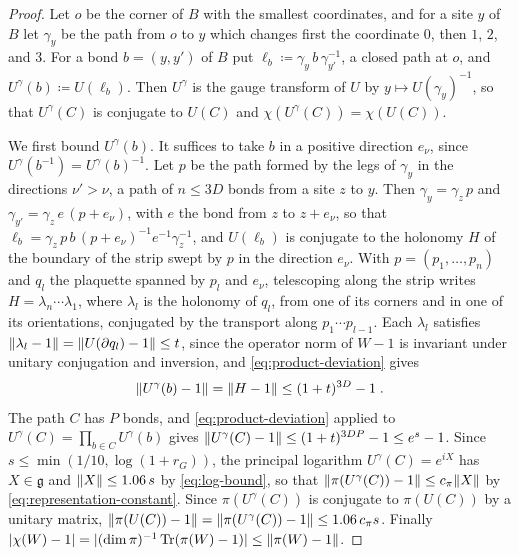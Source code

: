 \documentclass[11pt]{preprint}
\DeclarePairedDelimiter{\abs}{\lvert}{\rvert}
\DeclarePairedDelimiter{\norm}{\lVert}{\rVert}
\numberwithin{equation}{section}
\theoremstyle{definition}
\theoremstyle{remark}
\theoremstyle{plain}
\begin{document}
\begin{proof}
Let $o$ be the corner of $B$ with the smallest coordinates, and for a site $y$ of $B$ let $\gamma_y$ be the path from $o$ to $y$ which changes first the coordinate $0$, then $1$, $2$, and $3$. For a bond $b = (y, y')$ of $B$ put $\ell_b \coloneqq \gamma_y\,b\,\gamma_{y'}^{-1}$, a closed path at $o$, and $U^\gamma(b) \coloneqq U(\ell_b)$. Then $U^\gamma$ is the gauge transform of $U$ by $y \mapsto U(\gamma_y)^{-1}$, so that $U^\gamma(C)$ is conjugate to $U(C)$ and $\chi(U^\gamma(C)) = \chi(U(C))$.

We first bound $U^\gamma(b)$. It suffices to take $b$ in a positive direction $e_\nu$, since $U^\gamma(b^{-1}) = U^\gamma(b)^{-1}$. Let $p$ be the path formed by the legs of $\gamma_y$ in the directions $\nu' > \nu$, a path of $n \leq 3D$ bonds from a site $z$ to $y$. Then $\gamma_y = \gamma_z\,p$ and $\gamma_{y'} = \gamma_z\,e\,(p + e_\nu)$, with $e$ the bond from $z$ to $z + e_\nu$, so that $\ell_b = \gamma_z\,p\,b\,(p + e_\nu)^{-1}e^{-1}\gamma_z^{-1}$, and $U(\ell_b)$ is conjugate to the holonomy $H$ of the boundary of the strip swept by $p$ in the direction $e_\nu$. With $p = (p_1, \dots, p_n)$ and $q_l$ the plaquette spanned by $p_l$ and $e_\nu$, telescoping along the strip writes $H = \lambda_n\cdots\lambda_1$, where $\lambda_l$ is the holonomy of $q_l$, from one of its corners and in one of its orientations, conjugated by the transport along $p_1 \cdots p_{l-1}$. Each $\lambda_l$ satisfies $\norm{\lambda_l - 1} = \norm{U(\partial q_l) - 1} \leq t$, since the operator norm of $W - 1$ is invariant under unitary conjugation and inversion, and \eqref{eq:product-deviation} gives
\begin{equation}\label{eq:axial-bond}
    \norm{U^\gamma(b) - 1} = \norm{H - 1} \leq (1 + t)^{3D} - 1\;.
\end{equation}
The path $C$ has $P$ bonds, and \eqref{eq:product-deviation} applied to $U^\gamma(C) = \prod_{b \in C}U^\gamma(b)$ gives $\norm{U^\gamma(C) - 1} \leq (1 + t)^{3DP} - 1 \leq e^s - 1$. Since $s \leq \min(1/10, \log(1 + r_G))$, the principal logarithm $U^\gamma(C) = e^{iX}$ has $X \in \mathfrak g$ and $\norm{X} \leq 1.06\,s$ by \eqref{eq:log-bound}, so that $\norm{\pi(U^\gamma(C)) - 1} \leq c_\pi\norm{X}$ by \eqref{eq:representation-constant}. Since $\pi(U^\gamma(C))$ is conjugate to $\pi(U(C))$ by a unitary matrix, $\norm{\pi(U(C)) - 1} = \norm{\pi(U^\gamma(C)) - 1} \leq 1.06\,c_\pi s$. Finally $\abs{\chi(W) - 1} = \abs{(\dim\pi)^{-1}\operatorname{Tr}(\pi(W) - 1)} \leq \norm{\pi(W) - 1}$.
\end{proof}
\end{document}
